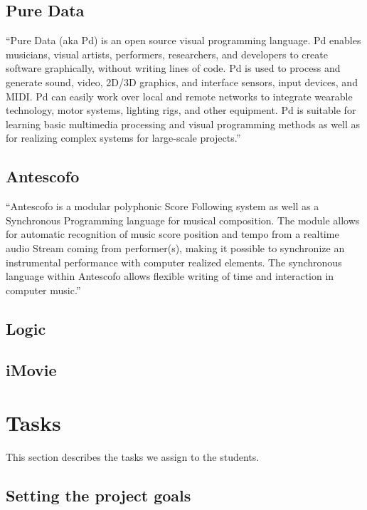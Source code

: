 \documentclass[onecolumn,nocopyrightspace,preprint]{sigplanconf}
\begin{document}
\subsection{Pure Data}

``Pure Data (aka Pd) is an open source visual programming language. Pd enables
musicians, visual artists, performers, researchers, and developers to create
software graphically, without writing lines of code. Pd is used to process
and generate sound, video, 2D/3D graphics, and interface sensors, input
devices, and MIDI. Pd can easily work over local and remote networks to
integrate wearable technology, motor systems, lighting rigs, and other
equipment. Pd is suitable for learning basic multimedia processing and
visual programming methods as well as for realizing complex systems for
large-scale projects.''~\cite{website:puredata}


\subsection{Antescofo}

``Antescofo is a modular polyphonic Score Following system as well as a
Synchronous Programming language for musical composition. The module allows
for automatic recognition of music score position and tempo from a realtime
audio Stream coming from performer(s), making it possible to synchronize an
instrumental performance with computer realized elements. The synchronous
language within Antescofo allows flexible writing of time and interaction in
computer music.''~\cite{website:antescofo}

\subsection{Logic}

\subsection{iMovie}


\section{Tasks}

This section describes the tasks we assign to the students.


\subsection{Setting the project goals}
\end{document}
